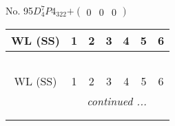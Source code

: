 \documentclass[fleqn,9pt,landscape]{jsarticle}
\begin{document}
\newpage
No. 95\quad$D_{4}^{7}$\quad$P4_322$\quad[ tetragonal ]\quad$+\begin{pmatrix} 0 & 0 & 0 \end{pmatrix}$
\begin{center}
\renewcommand{\arraystretch}{1.2}
\begin{longtable}{ccccccc}
 \hline \hline
WL (SS) & 1 & 2 & 3 & 4 & 5 & 6 \\ \hline \endfirsthead

\multicolumn{6}{l}{\tablename\ \thetable{}} \\
 \hline \hline
WL (SS) & 1 & 2 & 3 & 4 & 5 & 6 \\ \hline \endhead

 \hline \hline
\multicolumn{6}{r}{\footnotesize\it continued ...} \\ \endfoot

 \hline \hline
\multicolumn{6}{r}{} \\ \endlastfoot


\end{longtable}
\end{center}
\end{document}
